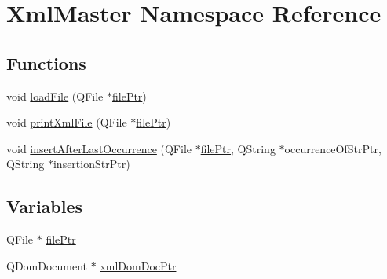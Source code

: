 \hypertarget{namespace_xml_master}{\section{Xml\-Master Namespace Reference}
\label{namespace_xml_master}
}
\subsection*{Functions}
\begin{DoxyCompactItemize}
\item 
void \hyperlink{namespace_xml_master_a46ee2c029bce45a53a41e3589e8de2a4}{load\-File} (Q\-File $\ast$\hyperlink{namespace_xml_master_aa7617b976593ed1594f194b72a6fbbee}{file\-Ptr})
\item 
void \hyperlink{namespace_xml_master_a403506effa37889ca401527113da1c5c}{print\-Xml\-File} (Q\-File $\ast$\hyperlink{namespace_xml_master_aa7617b976593ed1594f194b72a6fbbee}{file\-Ptr})
\item 
void \hyperlink{namespace_xml_master_ad6410c6eca04a1184a0f1fd90c75f0c9}{insert\-After\-Last\-Occurrence} (Q\-File $\ast$\hyperlink{namespace_xml_master_aa7617b976593ed1594f194b72a6fbbee}{file\-Ptr}, Q\-String $\ast$occurrence\-Of\-Str\-Ptr, Q\-String $\ast$insertion\-Str\-Ptr)
\end{DoxyCompactItemize}
\subsection*{Variables}
\begin{DoxyCompactItemize}
\item 
Q\-File $\ast$ \hyperlink{namespace_xml_master_aa7617b976593ed1594f194b72a6fbbee}{file\-Ptr}
\item 
Q\-Dom\-Document $\ast$ \hyperlink{namespace_xml_master_a79f559aff373f8cc4bb2caf7b26f13ad}{xml\-Dom\-Doc\-Ptr}
\end{DoxyCompactItemize}


